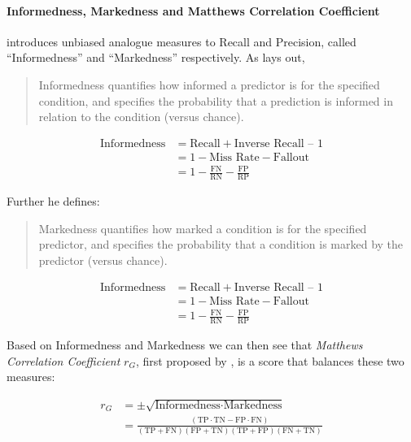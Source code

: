 \paragraph{Informedness, Markedness and Matthews Correlation Coefficient}
\label{par:Informedness, Markedness and Matthews Correlation Coefficient}

\cite{Powers:2011aa} introduces unbiased analogue measures to Recall and Precision, called ``Informedness'' and ``Markedness'' respectively. As \cite{Powers:2011aa} lays out, \blockquote{Informedness quantifies how informed a predictor is for the specified condition, and specifies the probability that a prediction is informed in relation to the condition (versus chance).}:

\begin{equation}
  \begin{split}
  \text{Informedness} &= \text{Recall} + \text{Inverse Recall} \text{ – } 1 \\
  &= 1 - \text{Miss Rate} - \text{Fallout} \\
  &= 1 - \frac{\text{FN}}{ \text{RN}} - \frac{\text{FP}}{\text{RP}}
  \end{split}
\end{equation}

Further he defines:
\blockquote{Markedness quantifies how marked a condition is for the specified predictor, and specifies the probability that a condition is marked by the predictor (versus chance).}

\begin{equation}
  \begin{split}
  \text{Informedness} &= \text{Recall} + \text{Inverse Recall} \text{ – } 1 \\
  &= 1 - \text{Miss Rate} - \text{Fallout} \\
  &= 1 - \frac{\text{FN}}{ \text{RN}} - \frac{\text{FP}}{\text{RP}}
  \end{split}
\end{equation}

Based on Informedness and Markedness we can then see that \emph{Matthews Correlation Coefficient} $r_{G}$, first proposed by \cite{Matthews:1975aa}, is a score that balances these two measures:

\begin{equation}
  \begin{split}
  r_{G} &= \pm \sqrt{\text{Informedness} \cdot \text{Markedness}} \\
  &= \frac{(\text{TP} \cdot \text{TN} - \text{FP} \cdot \text{FN})}{(\text{TP} + \text{FN})(\text{FP} + \text{TN})(\text{TP} + \text{FP})(\text{FN} + \text{TN})}
\end{split}
\end{equation}


